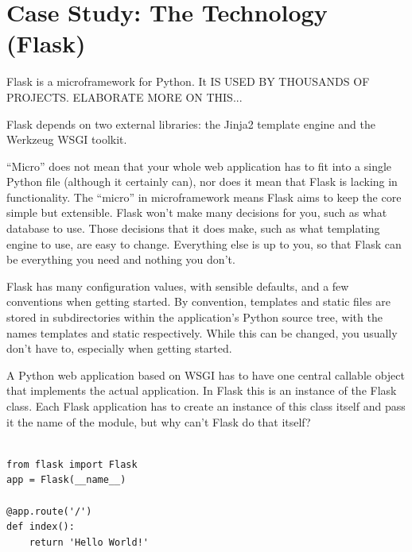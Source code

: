 \documentclass[conference]{IEEEtran}
\begin{document}

\newpage



\section{Case Study: The Technology (Flask)}
\label{sec:tool}

 Flask is a microframework for Python. It IS USED BY THOUSANDS OF PROJECTS. ELABORATE MORE ON THIS... 
 \vspace{2cm}

 Flask depends on two external libraries: the Jinja2 template engine and the Werkzeug WSGI toolkit. 

 “Micro” does not mean that your whole web application has to fit into a single Python file (although it certainly can), nor does it mean that Flask is lacking in functionality. The “micro” in microframework means Flask aims to keep the core simple but extensible. Flask won’t make many decisions for you, such as what database to use. Those decisions that it does make, such as what templating engine to use, are easy to change. Everything else is up to you, so that Flask can be everything you need and nothing you don’t.

 Flask has many configuration values, with sensible defaults, and a few conventions when getting started. By convention, templates and static files are stored in subdirectories within the application’s Python source tree, with the names templates and static respectively. While this can be changed, you usually don’t have to, especially when getting started.

 A Python web application based on WSGI has to have one central callable object that implements the actual application. In Flask this is an instance of the Flask class. Each Flask application has to create an instance of this class itself and pass it the name of the module, but why can’t Flask do that itself?

\begin{lstlisting}[style=custompython]

from flask import Flask
app = Flask(__name__)

@app.route('/')
def index():
    return 'Hello World!'

\end{lstlisting}
\end{document}
